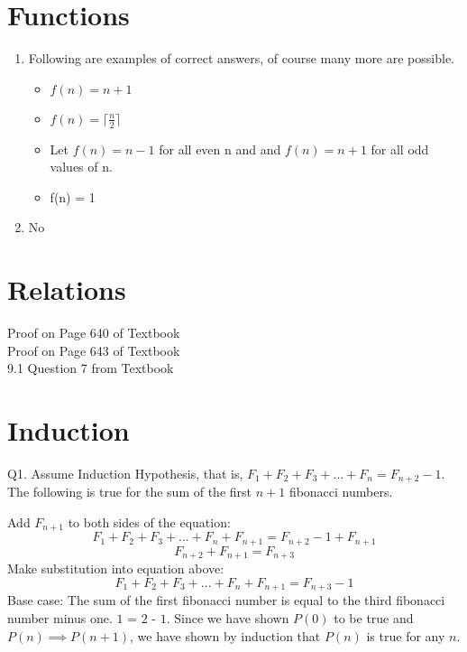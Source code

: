 \documentclass{article}
\begin{document}
    \section {Functions}
        \begin{enumerate}
            \item Following are examples of correct answers, of course many more are possible.
                \begin{itemize}
                    \item $f(n) = n + 1$
                    \item $f(n) = \lceil \frac{n}{2} \rceil$
                    \item Let $f(n) = n - 1$ for all even n and and $f(n) = n + 1$ for all odd values of n. 
                    \item f(n) = 1
                \end{itemize}
            \item No
        \end{enumerate}
    \section{Relations}
    Proof on Page 640 of Textbook \\
    Proof on Page 643 of Textbook \\
    9.1 Question 7 from Textbook
    \section{Induction}
	Q1. Assume Induction Hypothesis, that is, $F_{1} + F_{2} + F_{3} + ... + F_{n} = F_{n+2} - 1$. The following is true for the sum of the first $n + 1$ fibonacci numbers.

		Add $F_{n + 1}$ to both sides of the equation:
		$$ F_{1} + F_{2} + F_{3} + ... + F_{n} + F_{n + 1} = F_{n + 2} - 1 + F_{n + 1}$$
		$$ F_{n + 2} + F_{n + 1} = F_{n + 3}$$
		Make substitution into equation above:
		$$F_{1} + F_{2} + F_{3} + ... + F_{n} + F_{n + 1} = F_{n + 3} - 1$$
		Base case: \newline
			The sum of the first fibonacci number is equal to the third fibonacci number minus one. $1$ = $2$ - $1$. \newline
		Since we have shown $P(0)$ to be true and $P(n) \implies P(n + 1)$, we have shown by induction that $P(n)$ is true for any $n$.
\end{document}
